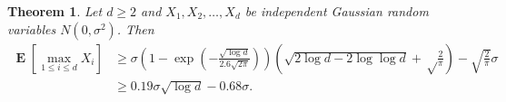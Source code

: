 \documentclass{article}
\DeclareMathOperator*{\Exp}{\mathbf{E}}
\newtheorem{theorem}{Theorem}
\begin{document}

\begin{theorem}
Let $d \ge 2$ and $X_1, X_2, \dots, X_d$ be independent Gaussian random variables $N(0,\sigma^2)$. Then
\begin{align*}
\Exp \left[\max_{1 \le i \le d} X_i\right]
&\ge \sigma \left(1 - \exp\left(-\frac{\sqrt{\log d}}{2.6 \sqrt{2\pi}}\right)\right) \left(\sqrt{2 \log d-2\log \log d} +\sqrt\frac{2}{\pi}\right) -\sqrt{\frac{2}{\pi}} \sigma \\
&\ge 0.19 \sigma \sqrt{\log d} - 0.68 \sigma.
\end{align*}
\end{theorem}
\end{document}
